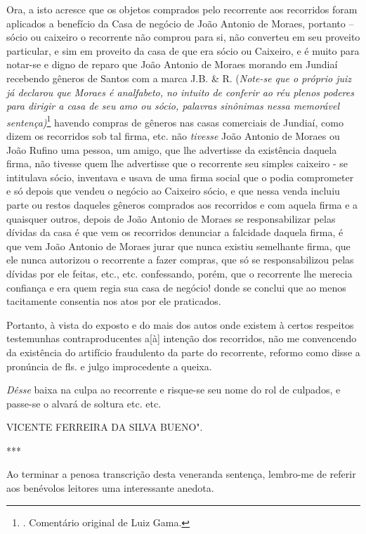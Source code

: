 Ora, a isto acresce que os objetos comprados pelo recorrente aos
recorridos foram aplicados a benefício da Casa de negócio de João
Antonio de Moraes, portanto -- sócio ou caixeiro o recorrente não
comprou para si, não converteu em seu proveito particular, e sim em
proveito da casa de que era sócio ou Caixeiro, e é muito para notar-se e
digno de reparo que João Antonio de Moraes morando em Jundiaí recebendo
gêneros de Santos com a marca J.B. \& R. (\emph{Note-se que o próprio
juiz já declarou que Moraes é analfabeto, no intuito de conferir ao réu
plenos poderes para dirigir a casa de seu amo ou sócio, palavras
sinônimas nessa memorável sentença)}\footnote{. Comentário original de
  Luiz Gama.} havendo compras de gêneros nas casas comerciais de
Jundiaí, como dizem os recorridos sob tal firma, etc. não \emph{tivesse}
João Antonio de Moraes ou João Rufino uma pessoa, um amigo, que lhe
advertisse da existência daquela firma, não tivesse quem lhe advertisse
que o recorrente seu simples caixeiro - se intitulava sócio, inventava e
usava de uma firma social que o podia comprometer e só depois que vendeu
o negócio ao Caixeiro sócio, e que nessa venda incluiu parte ou restos
daqueles gêneros comprados aos recorridos e com aquela firma e a
quaisquer outros, depois de João Antonio de Moraes se responsabilizar
pelas dívidas da casa é que vem os recorridos denunciar a falcidade
daquela firma, é que vem João Antonio de Moraes jurar que nunca existiu
semelhante firma, que ele nunca autorizou o recorrente a fazer compras,
que só se responsabilizou pelas dívidas por ele feitas, etc., etc.
confessando, porém, que o recorrente lhe merecia confiança e era quem
regia sua casa de negócio! donde se conclui que ao menos tacitamente
consentia nos atos por ele praticados.

Portanto, à vista do exposto e do mais dos autos onde existem à certos
respeitos testemunhas contraproducentes a{[}à{]} intenção dos
recorridos, não me convencendo da existência do artifício fraudulento da
parte do recorrente, reformo como disse a pronúncia de fls. e julgo
improcedente a queixa.

\emph{Dêsse} baixa na culpa ao recorrente e risque-se seu nome do rol de
culpados, e passe-se o alvará de soltura etc. etc.

VICENTE FERREIRA DA SILVA BUENO".

***

Ao terminar a penosa transcrição desta veneranda sentença, lembro-me de
referir aos benévolos leitores uma interessante anedota.

